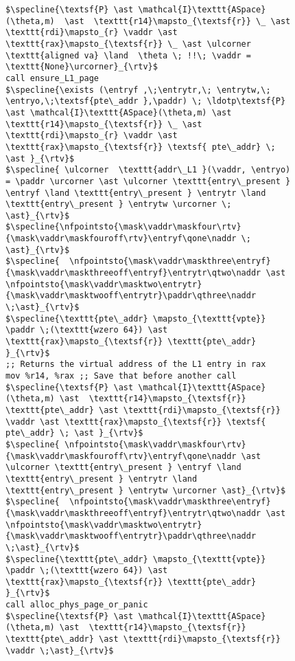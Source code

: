 \begin{figure}\footnotesize
  \begin{lstlisting}
$\specline{\textsf{P} \ast \mathcal{I}\texttt{ASpace}(\theta,m)  \ast  \texttt{r14}\mapsto_{\textsf{r}} \_ \ast \texttt{rdi}\mapsto_{r} \vaddr \ast \texttt{rax}\mapsto_{\textsf{r}} \_ \ast \ulcorner \texttt{aligned va} \land  \theta \; !!\; \vaddr = \texttt{None}\urcorner}_{\rtv}$
call ensure_L1_page
$\specline{\exists (\entryf ,\;\entrytr,\; \entrytw,\; \entryo,\;\textsf{pte\_addr },\paddr) \; \ldotp\textsf{P} \ast \mathcal{I}\texttt{ASpace}(\theta,m) \ast  \texttt{r14}\mapsto_{\textsf{r}} \_ \ast \texttt{rdi}\mapsto_{r} \vaddr \ast \texttt{rax}\mapsto_{\textsf{r}} \textsf{ pte\_addr} \; \ast }_{\rtv}$
$\specline{ \ulcorner  \texttt{addr\_L1 }(\vaddr, \entryo) = \paddr \urcorner \ast \ulcorner \texttt{entry\_present } \entryf \land \texttt{entry\_present } \entrytr \land  \texttt{entry\_present } \entrytw \urcorner \; \ast}_{\rtv}$
$\specline{\nfpointsto{\mask\vaddr\maskfour\rtv}{\mask\vaddr\maskfouroff\rtv}\entryf\qone\naddr \; \ast}_{\rtv}$ 
$\specline{  \nfpointsto{\mask\vaddr\maskthree\entryf}{\mask\vaddr\maskthreeoff\entryf}\entrytr\qtwo\naddr \ast \nfpointsto{\mask\vaddr\masktwo\entrytr}{\mask\vaddr\masktwooff\entrytr}\paddr\qthree\naddr \;\ast}_{\rtv}$
$\specline{\texttt{pte\_addr} \mapsto_{\texttt{vpte}} \paddr \;(\texttt{wzero 64}) \ast \texttt{rax}\mapsto_{\textsf{r}} \texttt{pte\_addr}  }_{\rtv}$
;; Returns the virtual address of the L1 entry in rax
mov %r14, %rax ;; Save that before another call
$\specline{\textsf{P} \ast \mathcal{I}\texttt{ASpace}(\theta,m) \ast  \texttt{r14}\mapsto_{\textsf{r}} \texttt{pte\_addr} \ast \texttt{rdi}\mapsto_{\textsf{r}} \vaddr \ast \texttt{rax}\mapsto_{\textsf{r}} \textsf{ pte\_addr} \; \ast }_{\rtv}$
$\specline{ \nfpointsto{\mask\vaddr\maskfour\rtv}{\mask\vaddr\maskfouroff\rtv}\entryf\qone\naddr \ast \ulcorner \texttt{entry\_present } \entryf \land \texttt{entry\_present } \entrytr \land  \texttt{entry\_present } \entrytw \urcorner \ast}_{\rtv}$ 
$\specline{  \nfpointsto{\mask\vaddr\maskthree\entryf}{\mask\vaddr\maskthreeoff\entryf}\entrytr\qtwo\naddr \ast \nfpointsto{\mask\vaddr\masktwo\entrytr}{\mask\vaddr\masktwooff\entrytr}\paddr\qthree\naddr \;\ast}_{\rtv}$
$\specline{\texttt{pte\_addr} \mapsto_{\texttt{vpte}} \paddr \;(\texttt{wzero 64}) \ast \texttt{rax}\mapsto_{\textsf{r}} \texttt{pte\_addr}  }_{\rtv}$
call alloc_phys_page_or_panic
$\specline{\textsf{P} \ast \mathcal{I}\texttt{ASpace}(\theta,m) \ast  \texttt{r14}\mapsto_{\textsf{r}} \texttt{pte\_addr} \ast \texttt{rdi}\mapsto_{\textsf{r}} \vaddr \;\ast}_{\rtv}$

\end{lstlisting}
\end{figure}
